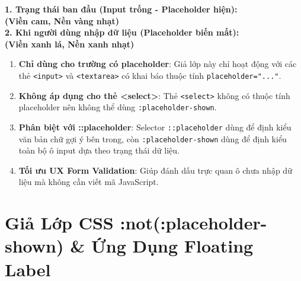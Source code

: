 \documentclass[11pt,oneside]{book}
\newcommand{\codeinline}[1]{\textcolor{accentOrange}{\texttt{#1}}}
\begin{document}
\begin{browserWindow}
\sffamily\small
\textbf{1. Trạng thái ban đầu (Input trống - Placeholder hiện):}\\[2pt]
 \quad \textcolor{accentOrange}{\bfseries (Viền cam, Nền vàng nhạt)}\\[8pt]
\textbf{2. Khi người dùng nhập dữ liệu (Placeholder biến mất):}\\[2pt]
 \quad \textcolor{green!60!black}{\bfseries (Viền xanh lá, Nền xanh nhạt)}
\end{browserWindow}

\begin{warnBox}
\begin{enumerate}[leftmargin=1.5em, itemsep=4pt, parsep=0pt]
    \item \textbf{Chỉ dùng cho trường có placeholder}: Giả lớp này chỉ hoạt động với các thẻ \codeinline{<input>} và \codeinline{<textarea>} có khai báo thuộc tính \codeinline{placeholder="..."}.
    \item \textbf{Không áp dụng cho thẻ <select>}: Thẻ \codeinline{<select>} không có thuộc tính placeholder nên không thể dùng \codeinline{:placeholder-shown}.
    \item \textbf{Phân biệt với ::placeholder}: Selector \codeinline{::placeholder} dùng để định kiểu văn bản chữ gợi ý bên trong, còn \codeinline{:placeholder-shown} dùng để định kiểu toàn bộ ô input dựa theo trạng thái dữ liệu.
    \item \textbf{Tối ưu UX Form Validation}: Giúp đánh dấu trực quan ô chưa nhập dữ liệu mà không cần viết mã JavaScript.
\end{enumerate}
\end{warnBox}

\section{Giả Lớp CSS :not(:placeholder-shown) \& Ứng Dụng Floating Label}
\label{sec:css_not_placeholder_shown}
\end{document}
